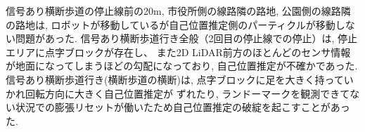\documentclass[twocolumn,9pt]{jsproceedings}
\begin{document}
信号あり横断歩道の停止線前の20m, 市役所側の線路隣の路地, 公園側の線路隣の路地は, 
ロボットが移動しているが自己位置推定側のパーティクルが移動しない問題があった. 
信号あり横断歩道行き全般（2回目の停止線での停止）は, 停止エリアに点字ブロックが存在し、
また2D LiDAR前方のほとんどのセンサ情報が地面になってしまうほどの勾配になっており, 自己位置推定が不確かであった.
信号あり横断歩道行き(横断歩道の横断)は, 点字ブロックに足を大きく持っていかれ回転方向に大きく自己位置推定が
ずれたり, ランドーマークを観測できてない状況での膨張リセットが働いたため自己位置推定の破綻を起こすことがあった. 









\end{document}

